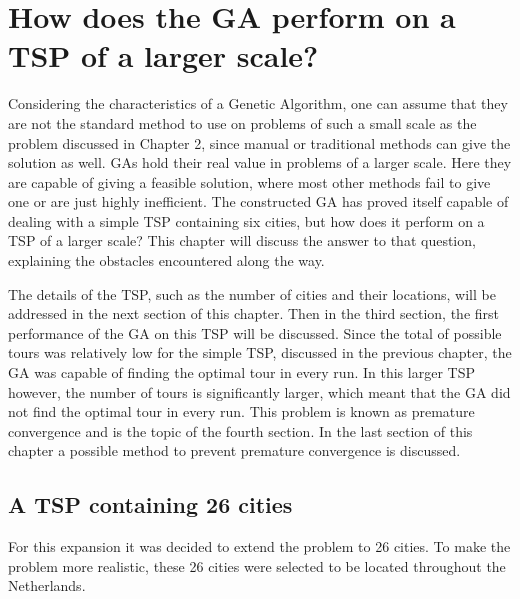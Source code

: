 \section{How does the GA perform on a TSP of a larger scale?}

\par
Considering the characteristics of a Genetic Algorithm, one can assume that they are not the standard method to use on problems of such a small scale as the problem discussed in Chapter 2, since manual or traditional methods can give the solution as well. GAs hold their real value in problems of a larger scale. Here they are capable of giving a feasible solution, where most other methods fail to give one or are just highly inefficient. The constructed GA has proved itself capable of dealing with a simple TSP containing six cities, but how does it perform on a TSP of a larger scale? This chapter will discuss the answer to that question, explaining the obstacles encountered along the way.
\par
The details of the TSP, such as the number of cities and their locations, will be addressed in the next section of this chapter. Then in the third section, the first performance of the GA on this TSP will be discussed. Since the total of possible tours was relatively low for the simple TSP, discussed in the previous chapter, the GA was capable of finding the optimal tour in every run. In this larger TSP however, the number of tours is significantly larger, which meant that the GA did not find the optimal tour in every run. This problem is known as premature convergence and is the topic of the fourth section. In the last section of this chapter a possible method to prevent premature convergence is discussed.

\subsection{A TSP containing 26 cities} %
For this expansion it was decided to extend the problem to 26 cities. To make the problem more realistic, these 26 cities were selected to be located throughout the Netherlands. 

